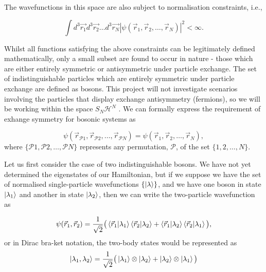 \documentclass[a4paper,10pt]{article}
\begin{document}
The wavefunctions in this space are also subject to normalisation constraints, i.e.,

\begin{equation*}
 \int d^3\vec{r_1} d^3\vec{r_2}\dots d^3\vec{r_N} |\psi(\vec{r}_{1},\vec{r}_{2},\dots,\vec{r}_{N})|^2<\infty.
\end{equation*}

Whilst all functions satisfying the above constraints can be legitimately defined mathematically, only a small subset are found to occur in nature - those which are either 
entirely symmetric or antisymmetric under particle exchange. The set of indistinguishable particles which are entirely symmetric under particle exchange are defined as bosons.
This project will not investigate scenarios involving the particles that display exchange antisymmetry (fermions), so we will be working within the space $S_N\mathcal{H}^N$ . We can formally
express the requirement of exhange symmetry for bosonic systems as \cite{Negele1988}

\begin{equation*}
 \psi({\vec{r}_{\mathcal{P}1},\vec{r}_{\mathcal{P}2},\dots,\vec{r}_{\mathcal{P}N}})= \psi(\vec{r}_{1},\vec{r}_{2},\dots,\vec{r}_{N}),
\end{equation*}
where $\{\mathcal{P}1,\mathcal{P}2,\dots,\mathcal{P}N  \}$ represents any permutation, $\mathcal{P}$, of the set $\{1,2,\dots,N\}$.

Let us first consider the case of two indistinguishable bosons. We have not yet determined the eigenstates 
of our Hamiltonian, but if we suppose we have the set of normalised single-particle wavefunctions $\{\ket{\lambda}\}$, and we have one boson in state $\ket{\lambda_1}$ and another
in state $\ket{\lambda_2}$, then we can write the two-particle wavefunction as

\begin{equation}
 \psi(\vec{r}_{1},\vec{r}_{2})=\frac{1}{\sqrt{2}}\big(\braket{\vec{r}_{1}|\lambda_1}\braket{\vec{r}_{2}|\lambda_2}+\braket{\vec{r}_{1}|\lambda_2}\braket{\vec{r}_{2}|\lambda_1}\big),
\end{equation}
or in Dirac bra-ket notation, the two-body states would be represented as
\begin{equation}
 \ket{\lambda_1,\lambda_2}=\frac{1}{\sqrt{2}}\big(\ket{\lambda_1}\otimes \ket{\lambda_2}+\ket{\lambda_2}\otimes\ket{\lambda_1}\big)
\end{equation}
\end{document}
